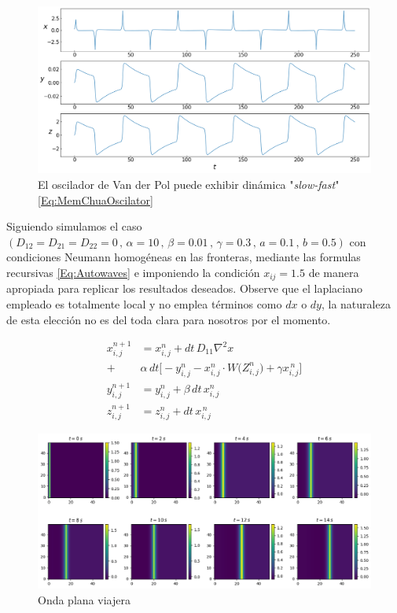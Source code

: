 \documentclass[11pt,letterpaper]{article}
\begin{document}
\begin{multicols*}{2}
\begin{figure}[H]
    \centering
    \includegraphics[scale=0.245]{SlowFastDynamicsMemVanderPolOscilator.png}
    \caption{El oscilador de Van der Pol puede exhibir dinámica "\textit{slow-fast}" \ref{Eq:MemChuaOscilator}}
    \label{Fig:MemCanChuaOscilator1D}
\end{figure}

Siguiendo \cite{Pham2012} simulamos el caso $(D_{12}\!=\!D_{21}\!=\!D_{22}\!=\!0 \,,\,  \alpha\!=\!10 \,,\,\beta\!=\!0.01 \,,\, \gamma\!=\!0.3\,,\,a\!=\!0.1 \,,\, b\!=\!0.5)$ con condiciones Neumann homogéneas en las fronteras, mediante las formulas recursivas \ref{Eq:Autowaves} e imponiendo la condición $x_{ij}=1.5$ de manera apropiada para replicar los resultados deseados. Observe que el laplaciano empleado es totalmente local y no emplea términos como $dx$ o $dy$, la naturaleza de esta elección no es del toda clara para nosotros por el momento.

\begin{align}
\label{Eq:Autowaves}
x^{n+1}_{i,j} &= x^{n}_{i,j} + dt\,D_{11}\nabla^2 x \nonumber \\
                +& \alpha\,dt\bigg[ - y^{n}_{i,j} - x^{n}_{i,j}\cdot W\big(Z^{n}_{i,j}\big) + \gamma x^{\,n}_{i,j} \bigg] \nonumber\\
y^{n+1}_{i,j} &= y^{n}_{i,j}  + \beta\,dt\,x^{n}_{i,j} \\
z^{n+1}_{i,j} &= z^{n}_{i,j} + dt\,x^{\,n}_{i,j} \nonumber
\end{align} 

\begin{figure}[H]
    \centering
    \includegraphics[scale=0.27]{PlaneWave.png}
    \caption{Onda plana viajera}
    \label{Fig:PlaneWave}
\end{figure}


\end{multicols*}
\end{document}
